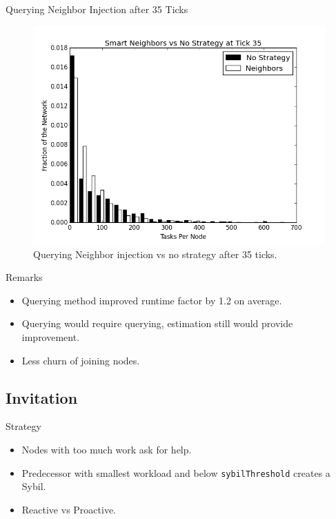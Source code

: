 \documentclass[11pt]{beamer}
\begin{document}
\begin{frame}{Querying Neighbor Injection after 35 Ticks}
\begin{figure}
	\centering
	\includegraphics[width=0.7\linewidth]{figs/neighborsStableSmartHist35}
	\caption[Smart Neighbor injection  vs no strategy after 35 ticks.]{Querying Neighbor injection  vs no strategy after 35 ticks.}
	\label{fig:neighborsStableSmartHist35}
\end{figure}
\end{frame}


\begin{frame}{Remarks}
	\begin{itemize}
		\item Querying method improved runtime factor by 1.2 on average.
		\item Querying would require querying, estimation still would provide improvement.
		\item Less churn of joining nodes.
	\end{itemize}
\end{frame}

\subsection{Invitation}
\begin{frame}{Strategy}
	\begin{itemize}
		\item Nodes with too much work ask for help.
		\item Predecessor with smallest workload and below \texttt{sybilThreshold} creates a Sybil.
		\item Reactive vs Proactive.
	\end{itemize}
\end{frame}
\end{document}
